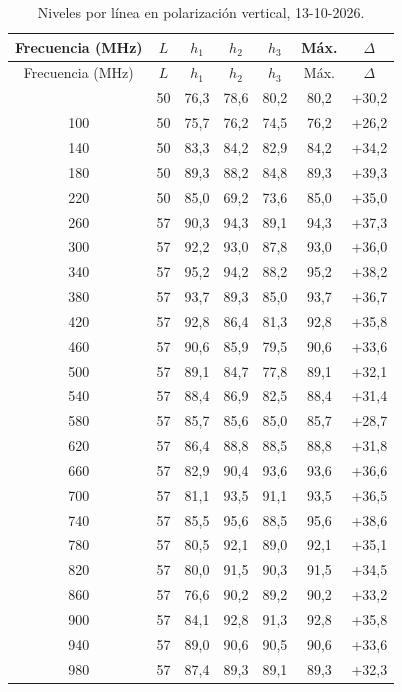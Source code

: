 \documentclass[11pt,a4paper]{article}
\begin{document}
\begingroup
\footnotesize
\begin{longtable}{|c|c|c|c|c|c|c|}
  \caption{Niveles por línea en polarización vertical, 13-10-2026.}\label{tab:niveles_v}\\
  \hline
  Frecuencia (MHz) & $L$ & $h_1$ & $h_2$ & $h_3$ & Máx. & $\Delta$ \\
  \hline
  \endfirsthead
  \hline
  Frecuencia (MHz) & $L$ & $h_1$ & $h_2$ & $h_3$ & Máx. & $\Delta$ \\
  \hline
  \endhead
  \hline
  \endfoot
  60 & 50 & 76,3 & 78,6 & 80,2 & 80,2 & +30,2 \\
  100 & 50 & 75,7 & 76,2 & 74,5 & 76,2 & +26,2 \\
  140 & 50 & 83,3 & 84,2 & 82,9 & 84,2 & +34,2 \\
  180 & 50 & 89,3 & 88,2 & 84,8 & 89,3 & +39,3 \\
  220 & 50 & 85,0 & 69,2 & 73,6 & 85,0 & +35,0 \\
  260 & 57 & 90,3 & 94,3 & 89,1 & 94,3 & +37,3 \\
  300 & 57 & 92,2 & 93,0 & 87,8 & 93,0 & +36,0 \\
  340 & 57 & 95,2 & 94,2 & 88,2 & 95,2 & +38,2 \\
  380 & 57 & 93,7 & 89,3 & 85,0 & 93,7 & +36,7 \\
  420 & 57 & 92,8 & 86,4 & 81,3 & 92,8 & +35,8 \\
  460 & 57 & 90,6 & 85,9 & 79,5 & 90,6 & +33,6 \\
  500 & 57 & 89,1 & 84,7 & 77,8 & 89,1 & +32,1 \\
  540 & 57 & 88,4 & 86,9 & 82,5 & 88,4 & +31,4 \\
  580 & 57 & 85,7 & 85,6 & 85,0 & 85,7 & +28,7 \\
  620 & 57 & 86,4 & 88,8 & 88,5 & 88,8 & +31,8 \\
  660 & 57 & 82,9 & 90,4 & 93,6 & 93,6 & +36,6 \\
  700 & 57 & 81,1 & 93,5 & 91,1 & 93,5 & +36,5 \\
  740 & 57 & 85,5 & 95,6 & 88,5 & 95,6 & +38,6 \\
  780 & 57 & 80,5 & 92,1 & 89,0 & 92,1 & +35,1 \\
  820 & 57 & 80,0 & 91,5 & 90,3 & 91,5 & +34,5 \\
  860 & 57 & 76,6 & 90,2 & 89,2 & 90,2 & +33,2 \\
  900 & 57 & 84,1 & 92,8 & 91,3 & 92,8 & +35,8 \\
  940 & 57 & 89,0 & 90,6 & 90,5 & 90,6 & +33,6 \\
  980 & 57 & 87,4 & 89,3 & 89,1 & 89,3 & +32,3 \\
\end{longtable}
\end{document}
